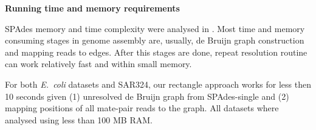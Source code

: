 \documentclass[a4paper]{article}
\def\ecoli{\emph{E.~coli}}
\begin{document}


\textbf{Running time and memory requirements}

SPAdes memory and time complexity were analysed in \cite{SPAdes}. Most time and memory consuming stages in genome assembly are, usually, de Bruijn graph construction and mapping reads to edges. After this stages are done, repeat resolution routine can work relatively fast and within small memory.

For both {\ecoli} datasets and SAR324, our rectangle approach works for less then 10 seconds given (1) unresolved de Bruijn graph from SPAdes-single and (2) mapping positions of all mate-pair reads to the graph. All datasets where analysed using less than 100 MB RAM.

%
%
%
%
%
%
%
%
%
%
%
\end{document}
